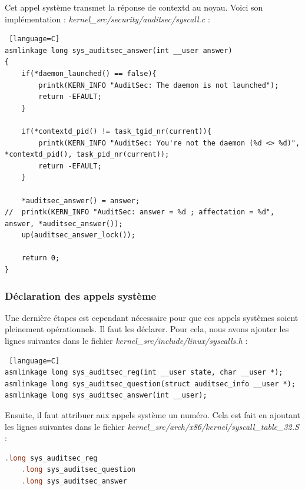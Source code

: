 \documentclass[pdftex,a4paper,titlepage,11pt]{article}
\begin{document}
Cet appel système transmet la réponse de contextd au noyau. Voici son implémentation :
\textit{{kernel\_src}/security/auditsec/syscall.c} :
\begin{lstlisting} [language=C]
asmlinkage long sys_auditsec_answer(int __user answer)
{
	if(*daemon_launched() == false){
		printk(KERN_INFO "AuditSec: The daemon is not launched");
		return -EFAULT;
	}

	if(*contextd_pid() != task_tgid_nr(current)){
		printk(KERN_INFO "AuditSec: You're not the daemon (%d <> %d)", *contextd_pid(), task_pid_nr(current));
		return -EFAULT;
	}

	*auditsec_answer() = answer;
// 	printk(KERN_INFO "AuditSec: answer = %d ; affectation = %d", answer, *auditsec_answer());
	up(auditsec_answer_lock());

	return 0;
}
\end{lstlisting}

\subsubsection{Déclaration des appels système}

Une dernière étapes est cependant nécessaire pour que ces appels systèmes soient pleinement opérationnels. Il faut les déclarer. Pour cela, nous avons ajouter les lignes suivantes dans le fichier \textit{{kernel\_src}/include/linux/syscalls.h} :
\begin{lstlisting} [language=C]
asmlinkage long sys_auditsec_reg(int __user state, char __user *);
asmlinkage long sys_auditsec_question(struct auditsec_info __user *);
asmlinkage long sys_auditsec_answer(int __user);
\end{lstlisting}

Ensuite, il faut attribuer aux appels système un numéro. Cela est fait en ajoutant les lignes suivantes dans le fichier \textit{{kernel\_src}/arch/x86/kernel/syscall\_table\_32.S} : %

\begin{lstlisting}[language=C]
	.long sys_auditsec_reg
	.long sys_auditsec_question
	.long sys_auditsec_answer
\end{lstlisting}

%
%
\end{document}
